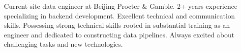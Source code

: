 

\begin{cvparagraph}

Current site data engineer at Beijing Procter \& Gamble. 2+ years experience specializing in backend development. Excellent technical and communication skills. Possessing strong technical skills rooted in substantial training as an engineer and dedicated to constructing data pipelines. Always excited about challenging tasks and new technologies.
\end{cvparagraph}
